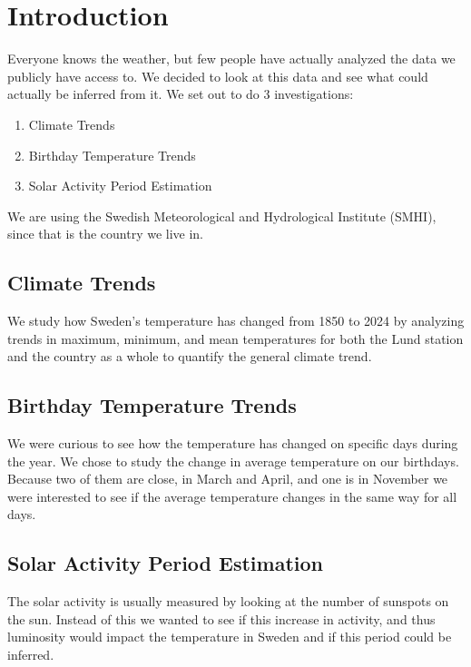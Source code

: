 

\section{Introduction}

Everyone knows the weather, but few people have actually analyzed the data we publicly have access to. We decided to look at this data and see what could actually be inferred from it. We set out to do 3 investigations:
\begin{enumerate}
    \item Climate Trends
    \item Birthday Temperature Trends
    \item Solar Activity Period Estimation
\end{enumerate}

We are using the Swedish Meteorological and Hydrological Institute (SMHI), since that is the country we live in.

\subsection{Climate Trends}
We study how Sweden’s temperature has changed from 1850 to 2024 by analyzing trends in maximum, minimum, and mean temperatures for both the Lund station and the country as a whole to quantify the general climate trend.

\subsection{Birthday Temperature Trends}

We were curious to see how the temperature has changed on specific days during the year. We chose to study the change in average temperature on our birthdays. Because two of them are close, in March and April, and one is in November we were interested to see if the average temperature changes in the same way for all days. 

\subsection{Solar Activity Period Estimation}
The solar activity is usually measured by looking at the number of sunspots on the sun. Instead of this we wanted to see if this increase in activity, and thus luminosity would impact the temperature in Sweden and if this period could be inferred.







